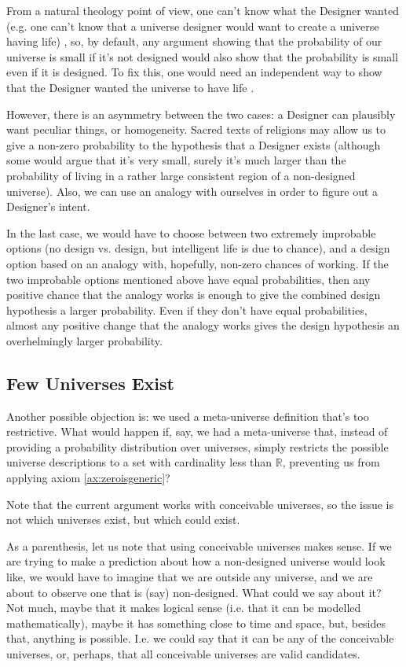 \documentclass[a4paper
,draft
]{article}
\def\reale{\mathbb{R}}
\begin{document}
From a natural theology point of view, one can't
know what the Designer wanted
(e.g. one can't know that a universe designer would want to create
a universe having life) \parencites{Sober2009}{Narveson2003}, so, by default,
any argument showing that the probability of our universe is small
if it's not designed would also show that the probability is small
even if it is designed.
To fix this, one would need an independent way to show that the Designer
wanted the universe to have life \parencite{Sober2003}.

However, there is an asymmetry between the two cases: a Designer can plausibly
want peculiar things, or homogeneity.
Sacred texts of religions may allow us to give a non-zero probability to
the hypothesis that a Designer exists (although some would argue that it's
very small, surely it's much larger than the probability of living in
a rather large consistent region of a non-designed universe).
Also, we can use an analogy with
ourselves in order to figure out a Designer's intent.

In the last case, we would have to
choose between two extremely improbable options
(no design vs. design, but intelligent life is due to chance),
and a design option based on an analogy with, hopefully,
non-zero chances of working.
If the two improbable options mentioned above have equal probabilities, then
any positive chance that the analogy
works is enough to give the combined design hypothesis a larger probability.
Even if they don't have equal probabilities, almost any positive change
that the analogy works gives the design hypothesis an overhelmingly larger
probability.

\subsection{Few Universes Exist}
\label{sec:fewuniverses}

Another possible objection is: we used a meta-universe definition that's too
restrictive. What would happen if, say, we had a meta-universe that, instead
of providing a probability distribution over universes, simply restricts the
possible universe descriptions to a set with cardinality less than $\reale$,
preventing us from applying axiom \ref{ax:zeroisgeneric}?

Note that the current argument works with conceivable universes, so the issue
is not which universes exist, but which could exist.

As a parenthesis, let us note that using conceivable universes makes sense.
If we are
trying to make a prediction about how a non-designed universe would
look like, we would have to imagine that we are outside any universe, and we are
about to observe one that is (say) non-designed. What could we say about it?
Not much, maybe that it makes logical sense (i.e. that it can be modelled
mathematically), maybe it has something close to time and space, but,
besides that, anything is possible.
I.e. we could say that it can be any
of the conceivable universes, or, perhaps,
that all conceivable universes are valid candidates.
\end{document}
